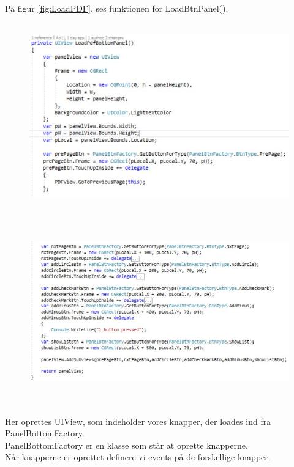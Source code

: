 På figur \ref{fig:LoadPDF}, ses funktionen for LoadBtnPanel().
\begin{figure}[H] %
	\centering
	\includegraphics[height=8cm, width=15cm]{../ArkitekturDesign/Design/RegisterPDF/LoadBtnPanel1}
\end{figure}
\begin{figure}[H] %
	\centering
	\includegraphics[height=8cm, width=15cm]{../ArkitekturDesign/Design/RegisterPDF/LoadBtnPanel2}
	\caption{}
	\label{fig:LoadBtnPanel2}
\end{figure}
Her oprettes UIView, som indeholder vores knapper, der loades ind fra PanelBottomFactory. \\
PanelBottomFactory er en klasse som står at oprette knapperne. \\
Når knapperne er oprettet definere vi events på de forskellige knapper. \\

\clearpage


